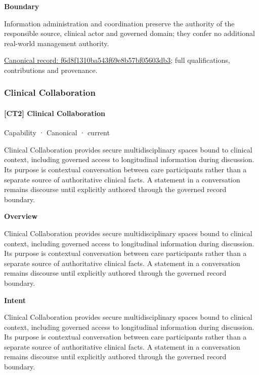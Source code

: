 \textbf{Boundary}



Information administration and coordination preserve the authority of the responsible source, clinical actor and governed domain; they confer no additional real-world management authority.


{\footnotesize \href{../../../../continuum/strategy/capability/f6d8f1310ba543f69e8b57bf05603db3.md}{Canonical record: f6d8f1310ba543f69e8b57bf05603db3}; full qualifications, contributions and provenance.}\par
\subsubsection{Clinical Collaboration}

\paragraph{[CT2] Clinical Collaboration}

\label{element:e6429225463a44d39f82e490e254e5d4}
{\small Capability · Canonical · current}\par

Clinical Collaboration provides secure multidisciplinary spaces bound to clinical context, including governed access to longitudinal information during discussion. Its purpose is contextual conversation between care participants rather than a separate source of authoritative clinical facts. A statement in a conversation remains discourse until explicitly authored through the governed record boundary.



\textbf{Overview}



Clinical Collaboration provides secure multidisciplinary spaces bound to clinical context, including governed access to longitudinal information during discussion. Its purpose is contextual conversation between care participants rather than a separate source of authoritative clinical facts. A statement in a conversation remains discourse until explicitly authored through the governed record boundary.



\textbf{Intent}



Clinical Collaboration provides secure multidisciplinary spaces bound to clinical context, including governed access to longitudinal information during discussion. Its purpose is contextual conversation between care participants rather than a separate source of authoritative clinical facts. A statement in a conversation remains discourse until explicitly authored through the governed record boundary.



